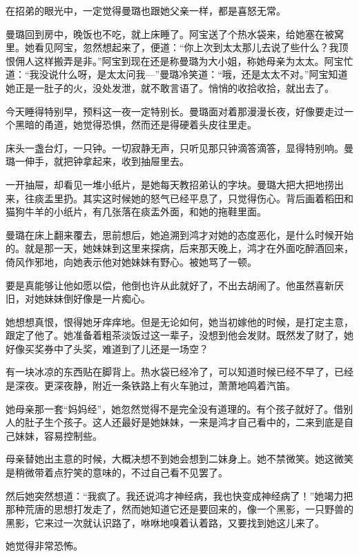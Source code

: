 \par 在招弟的眼光中，一定觉得曼璐也跟她父亲一样，都是喜怒无常。
\par 曼璐回到房中，晚饭也不吃，就上床睡了。阿宝送了个热水袋来，给她塞在被窝里。她看见阿宝，忽然想起来了，便道：“你上次到太太那儿去说了些什么？我顶恨佣人这样搬弄是非。”阿宝到现在还是称曼璐为大小姐，称她母亲为太太。阿宝忙道：“我没说什么呀，是太太问我—”曼璐冷笑道：“哦，还是太太不对。”阿宝知道她正是一肚子的火，没处发泄，就不敢言语了。悄悄的收拾收拾，就出去了。
\par 今天睡得特别早，预料这一夜一定特别长。曼璐面对着那漫漫长夜，好像要走过一个黑暗的甬道，她觉得恐惧，然而还是得硬着头皮往里走。
\par 床头一盏台灯，一只钟。一切寂静无声，只听见那只钟滴答滴答，显得特别响。曼璐一伸手，就把钟拿起来，收到抽屉里去。
\par 一开抽屉，却看见一堆小纸片，是她每天教招弟认的字块。曼璐大把大把地捞出来，往痰盂里扔。其实这时候她的怒气已经平息了，只觉得伤心。背后画着稻田和猫狗牛羊的小纸片，有几张落在痰盂外面，和她的拖鞋里面。
\par 曼璐在床上翻来覆去，思前想后，她追溯到鸿才对她的态度恶化，是什么时候开始的。就是那一天，她妹妹到这里来探病，后来那天晚上，鸿才在外面吃醉酒回来，倚风作邪地，向她表示他对她妹妹有野心。被她骂了一顿。
\par 要是真能够让他如愿以偿，他倒也许从此就好了，不出去胡闹了。他虽然喜新厌旧，对她妹妹倒好像是一片痴心。
\par 她想想真恨，恨得她牙痒痒地。但是无论如何，她当初嫁他的时候，是打定主意，跟定了他了。她准备着粗茶淡饭过这一辈子，没想到他会发财。既然发了财了，她好像买奖券中了头奖，难道到了儿还是一场空？
\par 有一块冰凉的东西贴在脚背上。热水袋已经冷了，可以知道时候已经不早了，已经是深夜。更深夜静，附近一条铁路上有火车驰过，萧萧地鸣着汽笛。
\par 她母亲那一套“妈妈经”，她忽然觉得不是完全没有道理的。有个孩子就好了。借别人的肚子生个孩子。这人还最好是她妹妹，一来是鸿才自己看中的，二来到底是自己妹妹，容易控制些。
\par 母亲替她出主意的时候，大概决想不到她会想到二妹身上。她不禁微笑。她这微笑是稍微带着点狞笑的意味的，不过自己看不见罢了。
\par 然后她突然想道：“我疯了。我还说鸿才神经病，我也快变成神经病了！”她竭力把那种荒唐的思想打发走了，然而她知道它还是要回来的，像一个黑影，一只野兽的黑影，它来过一次就认识路了，咻咻地嗅着认着路，又要找到她这儿来了。
\par 她觉得非常恐怖。


